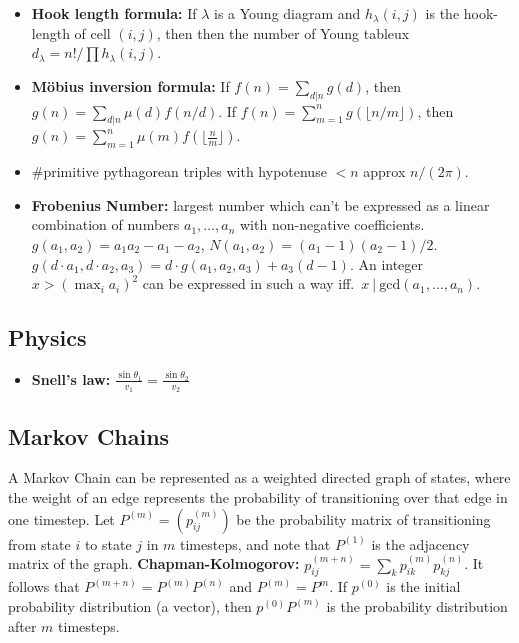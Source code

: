 \begin{itemize}[leftmargin=*]
    \item \textbf{Hook length formula:} If $\lambda$ is a Young diagram and $h_{\lambda}(i,j)$ is the hook-length of cell $(i,j)$, then then the number of Young tableux $d_{\lambda} = n!/\prod h_{\lambda}(i,j)$.
    \item \textbf{Möbius inversion formula:} If $f(n) = \sum_{d|n} g(d)$, then $g(n) = \sum_{d|n} \mu(d) f(n/d)$. If $f(n) = \sum_{m=1}^n g(\lfloor n/m\rfloor)$, then $g(n) = \sum_{m=1}^n \mu(m)f(\lfloor\frac{n}{m}\rfloor)$.
    \item \#primitive pythagorean triples with hypotenuse $<n$ approx $n/(2\pi)$.
    \item \textbf{Frobenius Number:} largest number which can't be
      expressed as a linear combination of numbers $a_1,\ldots,a_n$
      with non-negative coefficients. $g(a_1,a_2) = a_1a_2-a_1-a_2$,
      $N(a_1,a_2)=(a_1-1)(a_2-1)/2$. $g(d\cdot a_1,d\cdot a_2,a_3) =
      d\cdot g(a_1,a_2,a_3) + a_3(d-1)$. An integer $x>\left(\max_i
      a_i\right)^2$ can be expressed in such a way iff.\ $x\ |\
      \mathrm{gcd}(a_1,\ldots,a_n)$.
  \end{itemize}

  \subsection{Physics}
    \begin{itemize}
      \item \textbf{Snell's law:} $\frac{\sin\theta_1}{v_1} = \frac{\sin\theta_2}{v_2}$
    \end{itemize}

  \subsection{Markov Chains}
    A Markov Chain can be represented as a weighted directed graph of
    states, where the weight of an edge represents the probability of
    transitioning over that edge in one timestep. Let $P^{(m)} = (p^{(m)}_{ij})$
    be the probability matrix of transitioning from state $i$ to state $j$
    in $m$ timesteps, and note that $P^{(1)}$ is the adjacency matrix of
    the graph. \textbf{Chapman-Kolmogorov:} $p^{(m+n)}_{ij} = \sum_{k}
    p^{(m)}_{ik} p^{(n)}_{kj}$. It follows that $P^{(m+n)} =
    P^{(m)}P^{(n)}$ and $P^{(m)} = P^m$. If $p^{(0)}$ is the initial
    probability distribution (a vector), then $p^{(0)}P^{(m)}$ is the
    probability distribution after $m$ timesteps.

